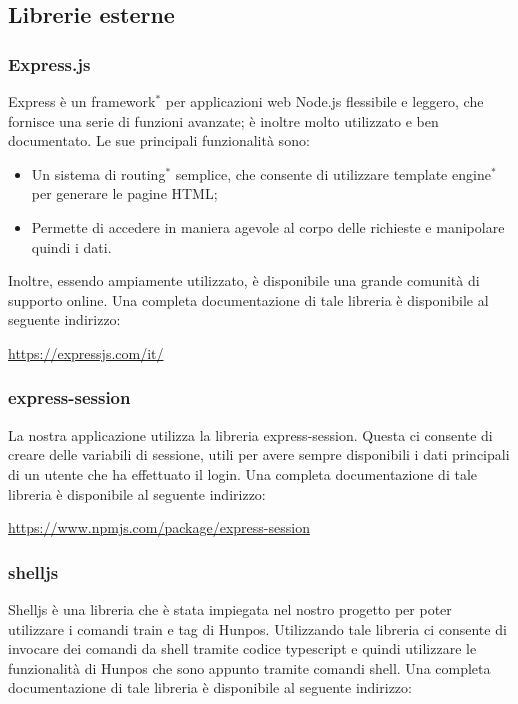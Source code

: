 \subsection{Librerie esterne}
\subsubsection{Express.js}

Express è un framework$^*$ per applicazioni web Node.js flessibile e leggero, che fornisce una serie di funzioni avanzate; è inoltre molto utilizzato e ben documentato. Le sue principali funzionalità sono:
\begin{itemize}
	\item Un sistema di routing$^*$ semplice, che consente di utilizzare template engine$^*$ per generare le pagine HTML;
	\item Permette di accedere in maniera agevole al corpo delle richieste e manipolare quindi i dati.
\end{itemize}
	Inoltre, essendo ampiamente utilizzato, è disponibile una grande comunità di supporto online.
Una completa documentazione di tale libreria è disponibile al seguente indirizzo:
\begin{center}
	\url{https://expressjs.com/it/}
\end{center}
\subsubsection{express-session}
La nostra applicazione utilizza la libreria express-session. Questa ci consente di creare delle variabili di sessione, utili per avere sempre disponibili i dati principali di un utente che ha effettuato il login.
Una completa documentazione di tale libreria è disponibile al seguente indirizzo:
\begin{center}
	\url{https://www.npmjs.com/package/express-session}
\end{center}
\subsubsection{shelljs}
Shelljs è una libreria che è stata impiegata nel nostro progetto per poter utilizzare i comandi train e tag di Hunpos. Utilizzando tale libreria ci consente di invocare dei comandi da shell tramite codice typescript e quindi utilizzare le funzionalità di Hunpos che sono appunto tramite comandi shell.
Una completa documentazione di tale libreria è disponibile al seguente indirizzo:

